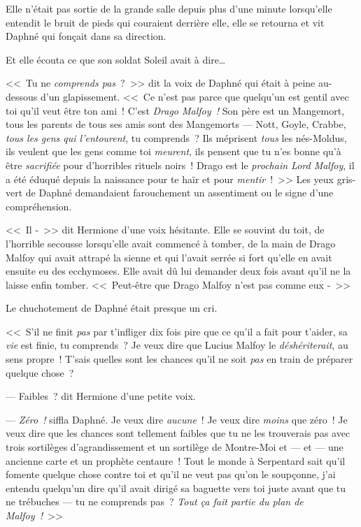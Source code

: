 Elle n'était pas sortie de la grande salle depuis plus d'une minute lorsqu'elle entendit le bruit de pieds qui couraient derrière elle, elle se retourna et vit Daphné qui fonçait dans sa direction.

Et elle écouta ce que son soldat Soleil avait à dire…

<<~Tu ne \emph{comprends pas}~?~>> dit la voix de Daphné qui était à peine au-dessous d'un glapissement. <<~Ce n'est pas parce que quelqu'un est gentil avec toi qu'il veut être ton ami~! C'est \emph{Drago Malfoy~!} Son père est un Mangemort, tous les parents de tous ses amis sont des Mangemorts — Nott, Goyle, Crabbe, \emph{tous les gens qui l'entourent}, tu comprends~? Ils méprisent \emph{tous} les nés-Moldus, ils veulent que les gens comme toi \emph{meurent}, ils pensent que tu n'es bonne qu'à être \emph{sacrifiée} pour d'horribles rituels noirs~! Drago est le \emph{prochain Lord Malfoy}, il a été éduqué depuis la naissance pour te haïr et pour \emph{mentir}~!~>> Les yeux gris-vert de Daphné demandaient farouchement un assentiment ou le signe d'une compréhension.

<<~Il -~>> dit Hermione d'une voix hésitante. Elle se souvint du toit, de l'horrible secousse lorsqu'elle avait commencé à tomber, de la main de Drago Malfoy qui avait attrapé la sienne et qui l'avait serrée si fort qu'elle en avait ensuite eu des ecchymoses. Elle avait dû lui demander deux fois avant qu'il ne la laisse enfin tomber. <<~Peut-être que Drago Malfoy n'est pas comme eux -~>>

Le chuchotement de Daphné était presque un cri.

<<~S'il ne finit \emph{pas} par t'infliger dix fois pire que ce qu'il a fait pour t'aider, sa \emph{vie} est finie, tu comprends~? Je veux dire que Lucius Malfoy le \emph{déshériterait}, au sens propre~! T'sais quelles sont les chances qu'il ne soit \emph{pas} en train de préparer quelque chose~?

--- Faibles~? dit Hermione d'une petite voix.

--- \emph{Zéro~!} siffla Daphné. Je veux dire \emph{aucune}~! Je veux dire \emph{moins} que zéro~! Je veux dire que les chances sont tellement faibles que tu ne les trouverais pas avec trois sortilèges d'agrandissement et un sortilège de Montre-Moi et — et — une ancienne carte et un prophète centaure~! Tout le monde à Serpentard sait qu'il fomente quelque chose contre toi et qu'il ne veut pas qu'on le soupçonne, j'ai entendu quelqu'un dire qu'il avait dirigé sa baguette vers toi juste avant que tu ne trébuches — tu ne comprends pas~? \emph{Tout ça fait partie du plan de Malfoy~!}~>>

